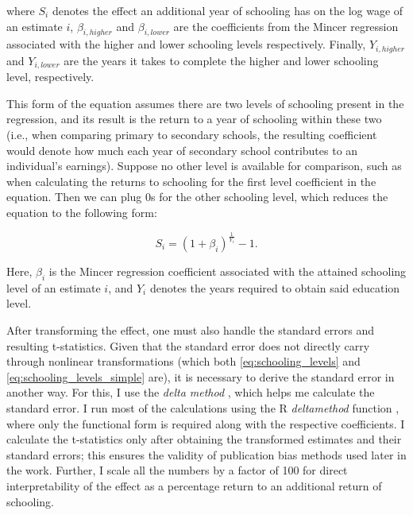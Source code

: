 where $S_i$ denotes the effect an additional year of schooling has on the log wage of an estimate $i$, $\beta_{i, higher}$ and $\beta_{i, lower}$ are the coefficients from the Mincer regression associated with the higher and lower schooling levels respectively. Finally, $Y_{i,higher}$ and $Y_{i,lower}$ are the years it takes to complete the higher and lower schooling level, respectively.

This form of the equation assumes there are two levels of schooling present in the regression, and its result is the return to a year of schooling within these two (i.e., when comparing primary to secondary schools, the resulting coefficient would denote how much each year of secondary school contributes to an individual's earnings). Suppose no other level is available for comparison, such as when calculating the returns to schooling for the first level coefficient in the equation. Then we can plug 0s for the other schooling level, which reduces the equation to the following form:

\begin{equation}
    \label{eq:schooling_levels_simple}
    S_i = \left(1 + \beta_i\right)^{\frac{1}{Y_i}} - 1.
\end{equation}

Here, $\beta_i$ is the Mincer regression coefficient associated with the attained schooling level of an estimate $i$, and $Y_i$ denotes the years required to obtain said education level.

After transforming the effect, one must also handle the standard errors and resulting t-statistics. Given that the standard error does not directly carry through nonlinear transformations (which both \autoref{eq:schooling_levels} and \autoref{eq:schooling_levels_simple} are), it is necessary to derive the standard error in another way. For this, I use the \textit{delta method} \citep{ziegel2002statistical}, which helps me calculate the standard error. I run most of the calculations using the R \textit{deltamethod} function \citep{fox2018r}, where only the functional form is required along with the respective coefficients. I calculate the t-statistics only after obtaining the transformed estimates and their standard errors; this ensures the validity of publication bias methods used later in the work. Further, I scale all the numbers by a factor of 100 for direct interpretability of the effect as a percentage return to an additional return of schooling.

